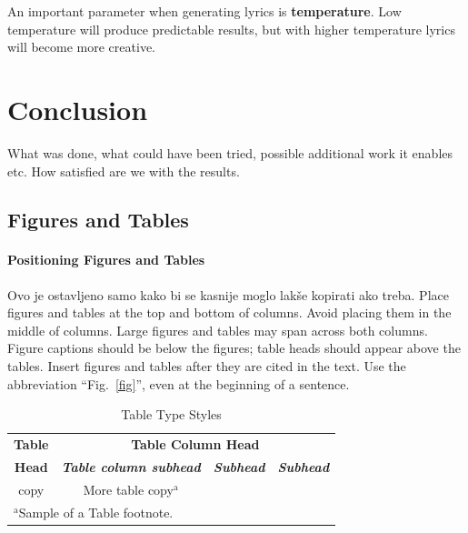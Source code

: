 \documentclass[conference]{IEEEtran}
\begin{document}
An important parameter when generating lyrics is \textbf{temperature}. Low temperature will produce predictable results, but with 
higher temperature lyrics will become more creative.

\section{Conclusion}
What was done, what could have been tried, possible additional work it enables
etc. How satisfied are we with the results.

 


\subsection{Figures and Tables}
\paragraph{Positioning Figures and Tables} 
Ovo je ostavljeno samo kako bi se kasnije moglo lakše kopirati ako treba.
Place figures and tables at the top and 
bottom of columns. Avoid placing them in the middle of columns. Large 
figures and tables may span across both columns. Figure captions should be 
below the figures; table heads should appear above the tables. Insert 
figures and tables after they are cited in the text. Use the abbreviation 
``Fig.~\ref{fig}'', even at the beginning of a sentence.

\begin{table}[htbp]
\caption{Table Type Styles}
\begin{center}
\begin{tabular}{|c|c|c|c|}
\hline
\textbf{Table}&\multicolumn{3}{|c|}{\textbf{Table Column Head}} \\
\cline{2-4} 
\textbf{Head} & \textbf{\textit{Table column subhead}}& \textbf{\textit{Subhead}}& \textbf{\textit{Subhead}} \\
\hline
copy& More table copy$^{\mathrm{a}}$& &  \\
\hline
\multicolumn{4}{l}{$^{\mathrm{a}}$Sample of a Table footnote.}
\end{tabular}
\label{tab1}
\end{center}
\end{table}
\end{document}
